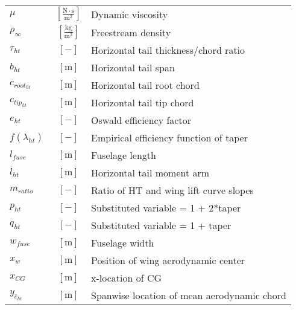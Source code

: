 \documentclass[12pt]{article}
\begin{document}
{\begin{supertabular}{lcl}
$\mu$ & $~\mathrm{[\tfrac{N\cdot s}{m^{2}}]}$ & Dynamic viscosity \\
$\rho_{\infty}$ & $~\mathrm{[\tfrac{kg}{m^{3}}]}$ & Freestream density \\
$\tau_{ht}$ & $~[-]$ & Horizontal tail thickness/chord ratio \\
$b_{ht}$ & $~\mathrm{[m]}$ & Horizontal tail span \\
$c_{root_{ht}}$ & $~\mathrm{[m]}$ & Horizontal tail root chord \\
$c_{tip_{ht}}$ & $~\mathrm{[m]}$ & Horizontal tail tip chord \\
$e_{ht}$ & $~[-]$ & Oswald efficiency factor \\
$f(\lambda_{ht})$ & $~[-]$ & Empirical efficiency function of taper \\
$l_{fuse}$ & $~\mathrm{[m]}$ & Fuselage length \\
$l_{ht}$ & $~\mathrm{[m]}$ & Horizontal tail moment arm \\
$m_{ratio}$ & $~[-]$ & Ratio of HT and wing lift curve slopes\\
$p_{ht}$ & $~[-]$ & Substituted variable = 1 + 2*taper \\
$q_{ht}$ & $~[-]$ & Substituted variable = 1 + taper \\
$w_{fuse}$ & $~\mathrm{[m]}$ & Fuselage width \\
$x_w$ & $~\mathrm{[m]}$ & Position of wing aerodynamic center \\
$x_{CG}$ & $~\mathrm{[m]}$ & x-location of CG \\
$y_{\bar{c}_{ht}}$ & $~\mathrm{[m]}$ & Spanwise location of mean aerodynamic chord \\
\bottomrule
\end{supertabular}}

 
\end{document}
